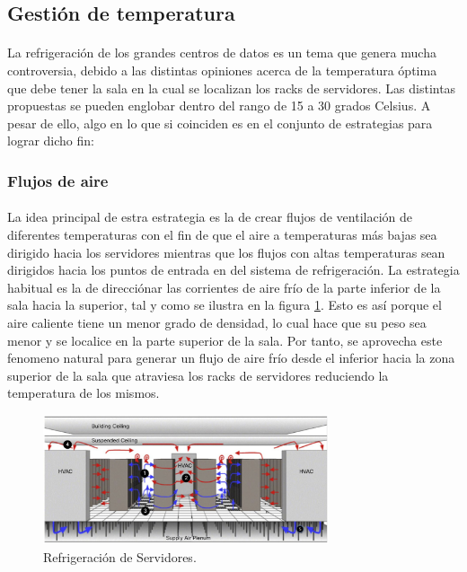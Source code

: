 \documentclass[10pt]{article}
\begin{document}
		\subsection{Gestión de temperatura}

			\paragraph{}
			La refrigeración de los grandes centros de datos es un tema que genera mucha controversia, debido a las distintas opiniones acerca de la temperatura óptima que debe tener la sala en la cual se localizan los racks de servidores. Las distintas propuestas se pueden englobar dentro del rango de 15 a 30 grados Celsius. A pesar de ello, algo en lo que si coinciden es en el conjunto de estrategias para lograr dicho fin:

			\subsubsection{Flujos de aire}

	 			\paragraph{}
				La idea principal de estra estrategia es la de crear flujos de ventilación de diferentes temperaturas con el fin de que el aire a temperaturas más bajas sea dirigido hacia los servidores mientras que los flujos con altas temperaturas sean dirigidos hacia los puntos de entrada en del sistema de refrigeración. La estrategia habitual es la de direcciónar las corrientes de aire frío de la parte inferior de la sala hacia la superior, tal y como se ilustra en la figura \ref{image:refrigeration}. Esto es así porque el aire caliente tiene un menor grado de densidad, lo cual hace que su peso sea menor y se localice en la parte superior de la sala. Por tanto, se aprovecha este fenomeno natural para generar un flujo de aire frío desde el inferior hacia la zona superior de la sala que atraviesa los racks de servidores reduciendo la temperatura de los mismos.

				\begin{figure}[htpb!]
					\begin{center}
						\includegraphics[width=0.75\textwidth]{refrigeration}
						\caption{Refrigeración de Servidores.\cite{cisco:guide}}
						\label{image:refrigeration}
					\end{center}
				\end{figure}
\end{document}
